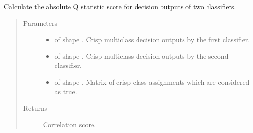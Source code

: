 \documentclass[letterpaper,10pt,english]{sphinxmanual}
\begin{document}
\begin{fulllineitems}
\label{\detokenize{pusion.evaluation.evaluation_metrics:pusion.evaluation.evaluation_metrics.abs_q_statistic}}
\sphinxAtStartPar
Calculate the absolute Q statistic score for decision outputs of two classifiers.
\begin{quote}\begin{description}
\item[{Parameters}] \leavevmode\begin{itemize}
\item {} 
\sphinxAtStartPar
{} \textendash{}  of shape .
Crisp multiclass decision outputs by the first classifier.

\item {} 
\sphinxAtStartPar
{} \textendash{}  of shape .
Crisp multiclass decision outputs by the second classifier.

\item {} 
\sphinxAtStartPar
{} \textendash{}  of shape .
Matrix of crisp class assignments which are considered as true.

\end{itemize}

\item[{Returns}] \leavevmode
\sphinxAtStartPar
Correlation score.

\end{description}\end{quote}

\end{fulllineitems}

\end{document}
